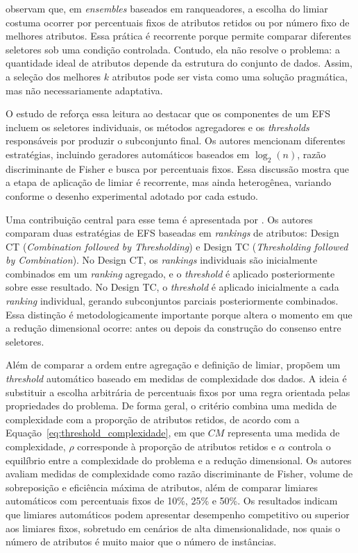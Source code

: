  observam que, em \textit{ensembles} baseados em ranqueadores, a escolha do limiar costuma ocorrer por percentuais fixos de atributos retidos ou por número fixo de melhores atributos. Essa prática é recorrente porque permite comparar diferentes seletores sob uma condição controlada. Contudo, ela não resolve o problema: a quantidade ideal de atributos depende da estrutura do conjunto de dados. Assim, a seleção dos melhores $k$ atributos pode ser vista como uma solução pragmática, mas não necessariamente adaptativa.

O estudo de  reforça essa leitura ao destacar que os componentes de um EFS incluem os seletores individuais, os métodos agregadores e os \textit{thresholds} responsáveis por produzir o subconjunto final. Os autores mencionam diferentes estratégias, incluindo geradores automáticos baseados em $\log_2(n)$, razão discriminante de Fisher e busca por percentuais fixos. Essa discussão mostra que a etapa de aplicação de limiar é recorrente, mas ainda heterogênea, variando conforme o desenho experimental adotado por cada estudo.

Uma contribuição central para esse tema é apresentada por . Os autores comparam duas estratégias de EFS baseadas em \textit{rankings} de atributos: Design CT (\textit{Combination followed by Thresholding}) e Design TC (\textit{Thresholding followed by Combination}). No Design CT, os \textit{rankings} individuais são inicialmente combinados em um \textit{ranking} agregado, e o \textit{threshold} é aplicado posteriormente sobre esse resultado. No Design TC, o \textit{threshold} é aplicado inicialmente a cada \textit{ranking} individual, gerando subconjuntos parciais posteriormente combinados. Essa distinção é metodologicamente importante porque altera o momento em que a redução dimensional ocorre: antes ou depois da construção do consenso entre seletores.

Além de comparar a ordem entre agregação e definição de limiar,  propõem um \textit{threshold} automático baseado em medidas de complexidade dos dados. A ideia é substituir a escolha arbitrária de percentuais fixos por uma regra orientada pelas propriedades do problema. De forma geral, o critério combina uma medida de complexidade com a proporção de atributos retidos, de acordo com a Equação~\ref{eq:threshold_complexidade}, em que $CM$ representa uma medida de complexidade, $\rho$ corresponde à proporção de atributos retidos e $\alpha$ controla o equilíbrio entre a complexidade do problema e a redução dimensional. Os autores avaliam medidas de complexidade como razão discriminante de Fisher, volume de sobreposição e eficiência máxima de atributos, além de comparar limiares automáticos com percentuais fixos de 10\%, 25\% e 50\%. Os resultados indicam que limiares automáticos podem apresentar desempenho competitivo ou superior aos limiares fixos, sobretudo em cenários de alta dimensionalidade, nos quais o número de atributos é muito maior que o número de instâncias.


